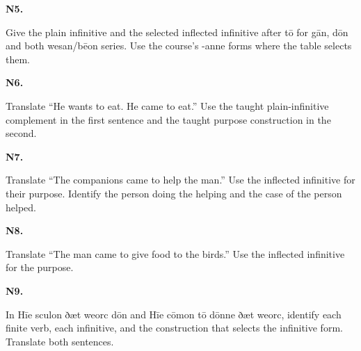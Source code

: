 \par\begin{minipage}{\linewidth}\raggedright
\textbf{N5.}

Give the plain infinitive and the selected inflected infinitive after tō for gān, dōn and both wesan/\allowbreak{}bēon series. Use the course’s -anne forms where the table selects them.

\end{minipage}\par\addvspace{4pt}

\par\begin{minipage}{\linewidth}\raggedright
\textbf{N6.}

Translate “He wants to eat. He came to eat.” Use the taught plain-infinitive complement in the first sentence and the taught purpose construction in the second.

\end{minipage}\par\addvspace{4pt}

\par\begin{minipage}{\linewidth}\raggedright
\textbf{N7.}

Translate “The companions came to help the man.” Use the inflected infinitive for their purpose. Identify the person doing the helping and the case of the person helped.

\end{minipage}\par\addvspace{4pt}

\par\begin{minipage}{\linewidth}\raggedright
\textbf{N8.}

Translate “The man came to give food to the birds.” Use the inflected infinitive for the purpose.

\end{minipage}\par\addvspace{4pt}

\par\begin{minipage}{\linewidth}\raggedright
\textbf{N9.}

In Hīe sculon ðæt weorc dōn and Hīe cōmon tō dōnne ðæt weorc, identify each finite verb, each infinitive, and the construction that selects the infinitive form. Translate both sentences.

\end{minipage}\par\addvspace{4pt}

